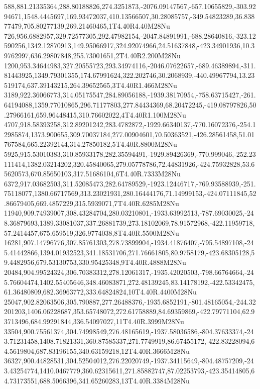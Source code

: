 588,881.21335364,288.80188826,274.3251873,-2076.09147567,-657.10655829,-303.9294671,1548.4445697,169.93472037,410.13566507,30.28085757,-349.54823289,36.83877479,705.80277139,269.21460465,1T4.40R4.40M28Nu
726,956.6882957,329.72577305,292.47982154,-2047.84891991,-688.28640816,-323.12590256,1342.12870913,149.95066917,324.92074966,24.51637848,-423.34901936,10.39762997,636.29807848,255.73001651,2T4.40R2.200M28Nu
1200,953.34644983,327.20555723,293.34974116,-2046.07622657,-689.46389894,-311.81443925,1349.79301355,174.67991624,322.202746,30.2068939,-440.49967794,13.23519174,637.39143215,264.39652565,3T4.40R1.466M28Nu
3189,922.36066773,314.05175547,284.89056188,-1939.38170954,-758.63715427,-261.64194088,1359.77010865,296.71177803,277.84434369,68.20472245,-419.08797826,50.27966161,659.96448415,310.76602022,4T4.40R1.100M28Nu
4707,918.58393258,312.89201242,283.4782872,-1929.66340137,-770.16072376,-254.12985874,1373.900655,309.70037184,277.00904601,70.50363521,-426.28561458,51.01767584,665.22392144,314.27850182,5T4.40R.8800M28Nu
5925,915.53010383,310.85933178,282.35594491,-1929.89426369,-770.999046,-252.23111414,1382.03214202,320.45840065,279.05778786,72.44831926,-424.75932828,53.65620573,670.85650103,317.51686104,6T4.40R.7333M28Nu
6372,917.03682503,311.52085473,282.64789529,-1923.12446717,-769.93588939,-251.75118077,1380.66717569,313.23021931,280.16444176,71.14999153,-424.07111845,52.86679405,669.4857229,315.5939071,7T4.40R.6285M28Nu
11940,909.74939007,308.43284704,280.03210801,-1933.63992513,-787.69030025,-248.36879693,1389.33081037,337.26881739,273.18102069,78.91572968,-422.11959718,57.2414457,675.659519,326.9774038,8T4.40R.5500M28Nu
16281,907.14796776,307.85761303,278.73899904,-1934.41876407,-795.54897108,-245.41442866,1394.01932523,341.18531706,271.76661805,80.9758179,-423.68305128,59.4482956,679.53130753,330.95425348,9T4.40R.4888M28Nu
20484,904.99524324,306.70383312,278.12061317,-1935.42020503,-798.66764664,-245.76604474,1402.55405646,348.46083871,272.48139245,83.14178192,-422.53342475,61.36480809,682.36963772,333.64824824,10T4.40R.4400M28Nu
25047,902.82063506,305.790887,277.26488376,-1935.6852191,-801.48165054,-244.32201203,1406.06228687,353.65748072,272.61758889,84.69359869,-422.79771104,62.93713496,684.99291844,336.54097027,11T4.40R.3999M28Nu
33504,900.75561374,304.74998549,276.48165619,-1937.58036586,-804.37633374,-243.71231458,1408.71821331,360.87585337,271.7749919,86.67455172,-422.83228094,64.5619804,687.83196155,340.63159218,12T4.40R.3666M28Nu
36327,900.44828531,304.52504012,276.22020749,-1937.34115649,-804.48757209,-243.43254774,1410.0467779,360.62315611,271.85882747,87.02253793,-423.35414805,64.73173551,688.5066396,341.65260283,13T4.40R.3384M28Nu
